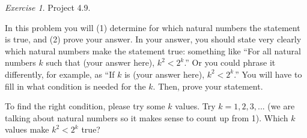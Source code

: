 \documentclass[12pt,oneside]{amsart}
\theoremstyle{remark}
\newtheorem{exer}{Exercise}
\begin{document}
\newpage
\begin{exer}
Project 4.9.

In this problem you will (1) determine for which natural numbers the statement is true, and (2) prove your answer. In your answer, you should state very clearly which natural numbers make the statement true: something like “For all natural numbers $k$ such that (your answer here), $k^2 < 2^k$.” Or you could phrase it differently, for example, as “If $k$ is (your answer here), $k^2 < 2^k$.” You will have to fill in what condition is needed for the $k$. Then, prove your statement.

To find the right condition, please try some $k$ values. Try  $k = 1, 2, 3, ...$ (we are talking about natural numbers so it makes sense to count up from 1). Which $k$ values make
$k^2 < 2^k$ true?
\end{exer}
\end{document}
